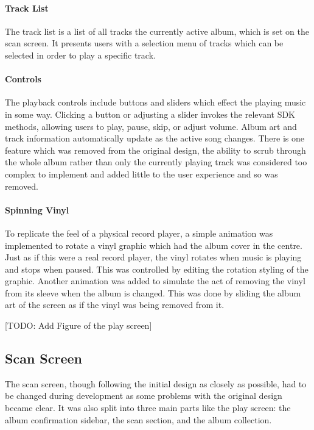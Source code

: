 \paragraph{Track List} The track list is a list of all tracks the currently active album, which is set on the scan screen. It presents users with a selection menu of tracks which can be selected in order to play a specific track.

\paragraph{Controls} The playback controls include buttons and sliders which effect the playing music in some way. Clicking a button or adjusting a slider invokes the relevant SDK methods, allowing users to play, pause, skip, or adjust volume. Album art and track information automatically update as the active song changes. There is one feature which was removed from the original design, the ability to scrub through the whole album rather than only the currently playing track was considered too complex to implement and added little to the user experience and so was removed.

\paragraph{Spinning Vinyl} To replicate the feel of a physical record player, a simple animation was implemented to rotate a vinyl graphic which had the album cover in the centre. Just as if this were a real record player, the vinyl rotates when music is playing and stops when paused. This was controlled by editing the rotation styling of the graphic. Another animation was added to simulate the act of removing the vinyl from its sleeve when the album is changed. This was done by sliding the album art of the screen as if the vinyl was being removed from it.

[TODO: Add Figure of the play screen]

\subsection{Scan Screen}
The scan screen, though following the initial design as closely as possible, had to be changed during development as some problems with the original design became clear. It was also split into three main parts like the play screen: the album confirmation sidebar, the scan section, and the album collection.

